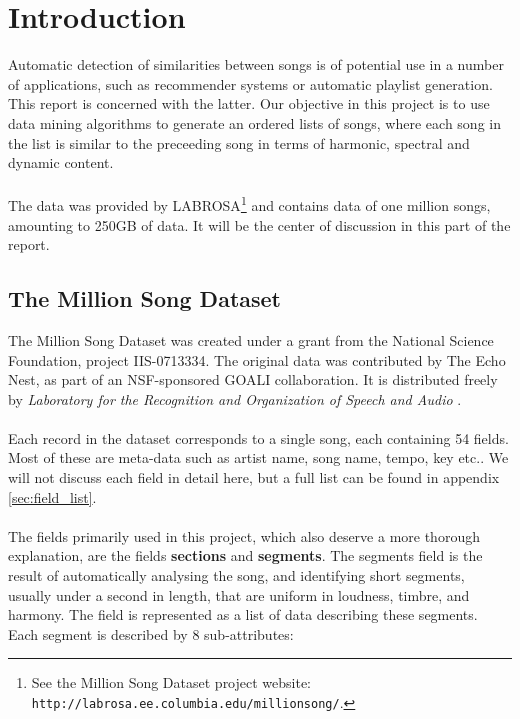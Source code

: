 \section{Introduction} %
\label{sec:introduction}
Automatic detection of similarities between songs is of potential use in a number of applications, such as recommender systems or automatic playlist generation. This report is concerned with the latter. Our objective in this project is to use data mining algorithms to generate an ordered lists of songs, where each song in the list is similar to the preceeding song in terms of harmonic, spectral and dynamic content.
\\\\
The data was provided by LABROSA\footnote{See the Million Song Dataset project website: \texttt{http://labrosa.ee.columbia.edu/millionsong/}.} and contains data of one million songs, amounting to 250GB of data. It will be the center of discussion in this part of the report.
\subsection{The Million Song Dataset} %
\label{sub:the_million_song_dataset}
The Million Song Dataset was created under a grant from the National Science Foundation, project IIS-0713334. The original data was contributed by The Echo Nest, as part of an NSF-sponsored GOALI collaboration. It is distributed freely by \textit{Laboratory for the Recognition and Organization of Speech and Audio} \citep{bert11}.
\\\\
Each record in the dataset corresponds to a single song, each containing 54 fields. Most of these are meta-data such as artist name, song name, tempo, key etc.. We will not discuss each field in detail here, but a full list can be found in appendix \ref{sec:field_list}.
\\\\
The fields primarily used in this project, which also deserve a more thorough explanation, are the fields \textbf{sections} and \textbf{segments}. The segments field is the result of automatically analysing the song, and identifying short segments, usually under a second in length, that are uniform in loudness, timbre, and harmony. The field is represented as a list of data describing these segments. Each segment is described by 8 sub-attributes:

